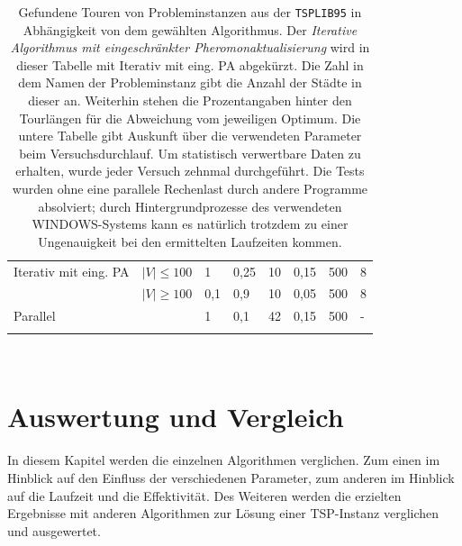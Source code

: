 \documentclass[doktyp=barbeit, sprache=german]{TUBAFarbeiten}
\begin{document}
\begin{landscape}
\begin{table}[]
{\begin{tabular}{ll|llllll}
Iterativ mit eing. PA & $|V| \leq 100$ & 1     & 0,25 & 10                    & 0,15                      & 500               & 8                                                                                                 \\
                      & $|V| \geq 100$ & 0,1   & 0,9  & 10                    & 0,05                      & 500               & 8                                                                                                 \\ \hline
Parallel              &                      & 1     & 0,1  & 42                    & 0,15                      & 500               & -                                                                                                 \\ \bottomrule
\multicolumn{8}{l}{}  \\ 
\end{tabular}%
}
\\\caption[Gefundene Touren von Probleminstanzen aus der \texttt{TSPLIB95} in Abhängigkeit von dem gewählten Algorithmus]{Gefundene Touren von Probleminstanzen aus der \texttt{TSPLIB95} in Abhängigkeit von dem gewählten Algorithmus. Der \textit{Iterative Algorithmus mit eingeschränkter Pheromonaktualisierung} wird in dieser Tabelle mit \glqq Iterativ mit eing. PA\grqq{} abgekürzt. Die Zahl in dem Namen der Probleminstanz gibt die Anzahl der Städte in dieser an. Weiterhin stehen die Prozentangaben hinter den Tourlängen für die Abweichung vom jeweiligen Optimum. Die untere Tabelle gibt Auskunft über die verwendeten Parameter beim Versuchsdurchlauf. Um statistisch verwertbare Daten zu erhalten, wurde jeder Versuch zehnmal durchgeführt. Die Tests wurden ohne eine parallele Rechenlast durch andere Programme absolviert; durch Hintergrundprozesse des verwendeten WINDOWS-Systems kann es natürlich trotzdem zu einer Ungenauigkeit bei den ermittelten Laufzeiten kommen.}
\label{table1}
\end{table}
\end{landscape}
\section{Auswertung und Vergleich}
In diesem Kapitel werden die einzelnen Algorithmen verglichen. Zum einen im Hinblick auf den Einfluss der verschiedenen Parameter, zum anderen im Hinblick auf die Laufzeit und die Effektivität. Des Weiteren werden die erzielten Ergebnisse mit anderen Algorithmen zur Lösung einer TSP-Instanz verglichen und ausgewertet.
\end{document}
